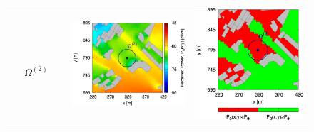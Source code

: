 \begin{figure}[H]
\begin{center}
\begin{tabular}{ccc}
\begin{sideways}\textcolor{white}{xxxxxxxxx}$\Omega^{(2)}$\end{sideways}&\includegraphics[scale=0.1]{./Figure/Planning.EM/RoI2/2/Fig.Received.Power.ZOOM.H-QoS-02.Reference.jpg}&\includegraphics[scale=0.1]{./Figure/Planning.EM/RoI2/2/Fig.Received.Power.ZOOM.RoI.Reference.Threshold.-65dBm.jpg}\tabularnewline

\end{tabular}
\end{center}
\end{figure}
